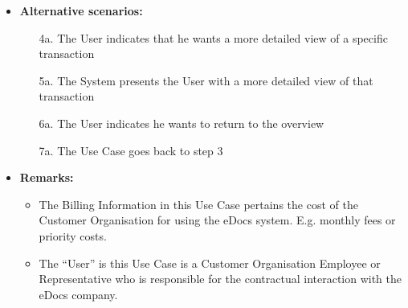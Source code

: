 \documentclass[a4paper,10pt]{article}
\begin{document}
\begin{itemize}
	\item \textbf{Alternative scenarios:} 
	\begin{enumerate}
		\item [4a.] The User indicates that he wants a more detailed view of a specific transaction
		\item [5a.] The System presents the User with a more detailed view of that transaction
		\item [6a.] The User indicates he wants to return to the overview
		\item [7a.] The Use Case goes back to step 3
	\end{enumerate}
	
	\item \textbf{Remarks:}
	   \begin{itemize}
          \item The Billing Information in this Use Case pertains the cost of the Customer Organisation for using the eDocs system. E.g. monthly fees or priority costs.
          \item The ``User'' is this Use Case is a Customer Organisation Employee or Representative who is responsible for the contractual interaction with the eDocs company.
        \end{itemize}
\end{itemize}
\end{document}
